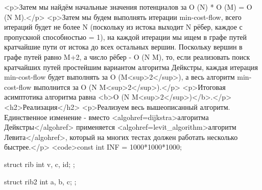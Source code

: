<p>Затем мы найдём начальные значения потенциалов за O (N) * O (M) = O (N M).</p>
<p>Затем мы будем выполнять итерации min-cost-flow, всего итераций будет не более N (поскольку из истока выходит N рёбер, каждое с пропускной способностью = 1), на каждой итерации мы ищем в графе путей кратчайшие пути от истока до всех остальных вершин. Поскольку вершин в графе путей равно M+2, а число рёбер - O (N M), то, если реализовать поиск кратчайших путей простейшим вариантом алгоритма Дейкстры, каждая итерация min-cost-flow будет выполнять за O (M<sup>2</sup>), а весь алгоритм min-cost-flow выполнится за O (N M<sup>2</sup>).</p>
<p>Итоговая асимптотика алгоритма равна <b>O (N M<sup>2</sup>)</b>.</p>
<h2>Реализация</h2>
<p>Реализуем весь вышеописанный алгоритм. Единственное изменение - вместо <algohref=dijkstra>алгоритма Дейкстры</algohref> применяется <algohref=levit_algorithm>алгоритм Левита</algohref>, который на многих тестах должен работать несколько быстрее.</p>
<code>const int INF = 1000*1000*1000;

struct rib {
	int v, c, id;
};

struct rib2 {
	int a, b, c;
};

